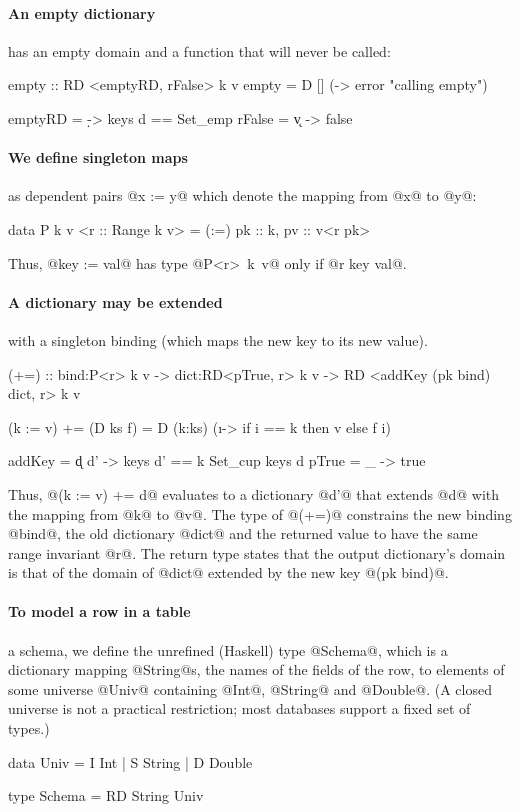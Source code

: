 \paragraph{An empty dictionary} has an empty domain 
and a function that will never be called:
%
\begin{code}
  empty   :: RD <emptyRD, rFalse> k v
  empty   = D [] (\x -> error "calling empty")

  emptyRD = \d -> keys d == Set_emp
  rFalse  = \k v -> false
\end{code}
 
\paragraph{We define singleton maps} as dependent pairs 
@x := y@ which denote the mapping from @x@ to @y@:
%
\begin{code}
  data P k v <r :: Range k v> 
    = (:=) {pk :: k, pv :: v<r pk>}
\end{code}
%
Thus, @key := val@ has type \hbox{@P<r> k v@} only if 
@r key val@.

\paragraph{A dictionary may be extended} with a singleton
binding (which maps the new key to its new value). 
%
\begin{code}
  (+=)   :: bind:P<r> k v 
         -> dict:RD<pTrue, r> k v 
         -> RD <addKey (pk bind) dict, r> k v
 
  (k := v) += (D ks f) 
         = D (k:ks) 
             (\i -> if i == k then v else f i)
  
  addKey = \k d d' -> keys d' == {k} Set_cup keys d
  pTrue  = \_ -> true
\end{code}
%
Thus, @(k := v)  += d@ evaluates to 
a dictionary @d'@ that extends @d@ 
with the mapping from @k@ to @v@.
%
The type of @(+=)@ constrains the new binding @bind@, 
the old dictionary @dict@ and the returned value to have 
the same range invariant @r@.
%
The return type states that the output dictionary's 
domain is that of the domain of @dict@ extended by 
the new key @(pk bind)@.

\paragraph{To model a row in a table} \ie a schema, 
we define the unrefined (Haskell) type @Schema@, 
which is a dictionary mapping @String@s, \ie the 
names of the fields of the row, to elements of 
some universe @Univ@ containing @Int@, @String@ 
and @Double@.
%
(A closed universe is not a practical restriction; 
most databases support a fixed set of types.)
% 
\begin{code}
  data Univ   = I Int | S String | D Double

  type Schema = RD String Univ
\end{code}

